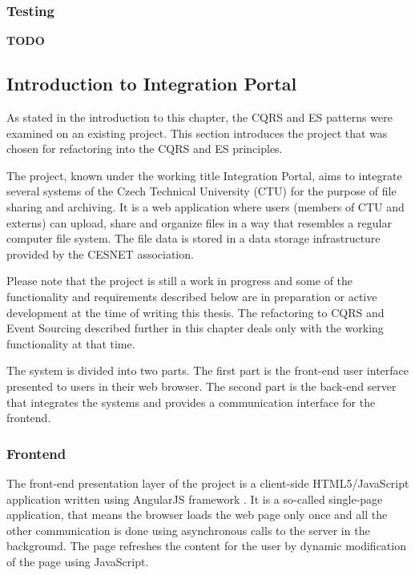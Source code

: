 \documentclass{book}
\begin{document}
\subsubsection{Testing}\label{testing}

\textbf{TODO}


\subsection{Introduction to Integration
Portal}\label{introduction-to-integration-portal}

As stated in the introduction to this chapter, the CQRS and ES patterns
were examined on an existing project. This section introduces the
project that was chosen for refactoring into the CQRS and ES principles.

The project, known under the working title Integration Portal, aims to
integrate several systems of the Czech Technical University (CTU) for
the purpose of file sharing and archiving. It is a web application where
users (members of CTU and externs) can upload, share and organize files
in a way that resembles a regular computer file system. The file data is
stored in a data storage infrastructure provided by the CESNET
association.

Please note that the project is still a work in progress and some of the
functionality and requirements described below are in preparation or
active development at the time of writing this thesis. The refactoring
to CQRS and Event Sourcing described further in this chapter deals only
with the working functionality at that time.

The system is divided into two parts. The first part is the front-end
user interface presented to users in their web browser. The second part
is the back-end server that integrates the systems and provides a
communication interface for the frontend.

\subsubsection{Frontend}\label{frontend}

The front-end presentation layer of the project is a client-side
HTML5/JavaScript application \cite{frontend} written using AngularJS
framework \cite{angular}. It is a so-called single-page application,
that means the browser loads the web page only once and all the other
communication is done using asynchronous calls to the server in the
background. The page refreshes the content for the user by dynamic
modification of the page using JavaScript.
\end{document}
